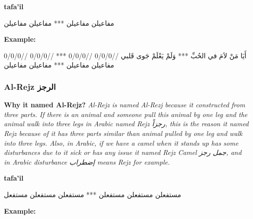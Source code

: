
\textbf{tafa'il}

\begin{Arabic}
	\begin{traditionalpoem*}
مفاعيلن مفاعيلن *** مفاعيلن مفاعيلن
          

	\end{traditionalpoem*}
      \end{Arabic}


\textbf{Example:}

\begin{Arabic}
	\begin{traditionalpoem*}
          أَيَا مَنْ لاَمَ في الحُبِّ *** وَلَمْ يَعْلَمْ جَوى قَلبي
          //0/0/0 //0/0/0 *** //0/0/0 //0/0/0
          مفاعيلن مفاعيلن *** مفاعيلن مفاعيلن
          
          

          
	\end{traditionalpoem*}
      \end{Arabic}

      

\subsubsection{Al-Rejz \textarabic{الرجز}}
\textbf{Why it named Al-Rejz?}
\textit{Al-Rejz is named Al-Rezj because it constructed from three parts. If there is an animal and someone pull this animal by one leg and the animal walk into three legs in Arabic named Rejz \textarabic{رجزاً}, this is the reason it named Rejz because of it has three parts similar than animal pulled by one leg and walk into three legs. Also, in Arabic, if we have a camel when it stands up has some disturbances due to it sick or has any issue it named Rejz Camel \textarabic{جمل رجز}, and in Arabic disturbance \textarabic{إضطراب} means Rejz for example.}

\textbf{tafa'il}

\begin{Arabic}
  \begin{traditionalpoem*}
    مستفعلن مستفعلن مستفعلن *** مستفعلن مستفعلن مستفعل
    

	\end{traditionalpoem*}
      \end{Arabic}


\textbf{Example:}

